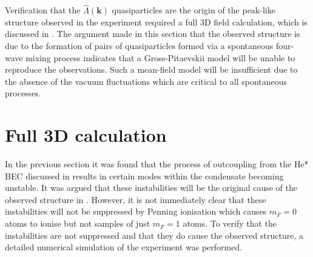 Verification that the $\hat{\Lambda}(\bm{k})$ quasiparticles are the origin of the peak-like structure observed in the experiment required a full 3D field calculation, which is discussed in .  The argument made in this section that the observed structure is due to the formation of pairs of quasiparticles formed via a spontaneous four-wave mixing process indicates that a Gross-Pitaevskii model will be unable to reproduce the observations. Such a mean-field model will be insufficient due to the absence of the vacuum fluctuations which are critical to all spontaneous processes.

\section{Full 3D calculation}
\label{Peaks:3DCalculation}
In the previous section it was found that the process of outcoupling from the He* BEC discussed in  results in certain modes within the condensate becoming unstable. It was argued that these instabilities will be the original cause of the observed structure in . However, it is not immediately clear that these instabilities will not be suppressed by Penning ionisation which causes $m_F=0$ atoms to ionise but not samples of just $m_F=1$ atoms. To verify that the instabilities are not suppressed and that they do cause the observed structure, a detailed numerical simulation of the experiment was performed.

